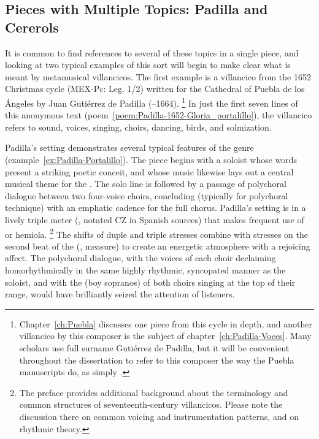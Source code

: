 %	
%
\subsection{%
Pieces with Multiple Topics: Padilla and Cererols
}

It is common to find references to several of these topics in a single piece, and looking at two typical examples of this sort will begin to make clear what is meant by metamusical villancicos.
The first example is a villancico from the 1652 Christmas cycle (MEX-Pc: Leg. 1/2) written for the Cathedral of Puebla de los Ángeles by Juan Gutiérrez de Padilla (--1664).%
	\footnote{%
	Chapter~\ref{ch:Puebla} discusses one piece from this cycle in depth, and another villancico by this composer is the subject of chapter~\ref{ch:Padilla-Voces}.
	Many scholars use full surname Gutiérrez de Padilla, but it will be convenient throughout the dissertation to refer to this composer the way the Puebla manuscripts do, as simply .
	}
In just the first seven lines of this anonymous text (poem~\ref{poem:Padilla-1652-Gloria_portalillo}), the villancico refers to sound, voices, singing, choirs, dancing, birds, and solmization.

%
%
Padilla's setting demonstrates several typical features of the genre (example~\ref{ex:Padilla-Portalillo}).
The piece begins with a soloist whose words present a striking poetic conceit, and whose music likewise lays out a central musical theme for the  .
The solo line is followed by a passage of polychoral dialogue between two four-voice choirs, concluding (typically for polychoral technique) with an emphatic cadence for the full chorus.
Padilla's setting is in a lively triple meter (, notated CZ in Spanish sources) that makes frequent use of  or hemiola.%
	\footnote{%
	The preface provides additional background about the terminology and common structures of seventeenth-century villancicos.
	Please note the discussion there on common voicing and instrumentation patterns, and on rhythmic theory.
	}
The shifts of duple and triple stresses combine with stresses on the second beat of the  (, measure) to create an energetic atmosphere with a rejoicing affect.
The polychoral dialogue, with the voices of each choir declaiming homorhythmically in the same highly rhythmic, syncopated manner as the soloist, and with the  (boy sopranos) of both choirs singing at the top of their range, would have brilliantly seized the attention of listeners.

